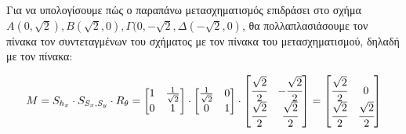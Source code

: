 \begin{solution}
Για να υπολογίσουμε πώς ο παραπάνω μετασχηματισμός επιδράσει στο σχήμα $A (0, \sqrt{2}), B(\sqrt{2},0), \Gamma (0, -\sqrt{2}, \Delta(-\sqrt{2},0)$, θα πολλαπλασιάσουμε τον πίνακα τον συντεταγμένων του σχήματος με τον πίνακα του μετασχηματισμού, δηλαδή με τον πίνακα:

\[
	M = S_{h_x} \cdot S_{S_x, S_y} \cdot R_{\theta}  = 
	\begin{bmatrix}
		1 & \frac{1}{\sqrt{2}} \\
		0 & 1 
	\end{bmatrix}
\cdot 
	\begin{bmatrix}
		\frac{1}{\sqrt{2}} & 0 \\
		0 & 1
	\end{bmatrix}
\cdot
	\begin{bmatrix}
		\cfrac{\sqrt{2}}{2} & -\cfrac{\sqrt{2}}{2} \\
			 \cfrac{\sqrt{2}}{2} & \cfrac{\sqrt{2}}{2}
	\end{bmatrix}	
	=
	\begin{bmatrix}
		\cfrac{\sqrt{2}}{2} & 0 \\
			 \cfrac{\sqrt{2}}{2} & \cfrac{\sqrt{2}}{2}
	\end{bmatrix}
\] 

\end{solution}